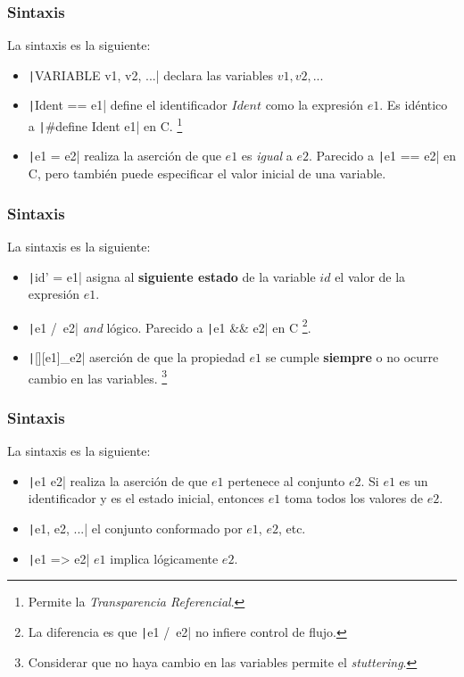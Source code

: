 \documentclass{beamer}
\begin{document}
\begin{frame}[fragile]
  \frametitle{Sintaxis}

  La sintaxis es la siguiente:

  \begin{itemize}
    \item \texttt|VARIABLE v1, v2, ...| declara las variables $v1, v2, ...$
    \item \texttt|Ident == e1| define el identificador $Ident$ como la expresión $e1$.
          Es idéntico a \texttt|#define Ident e1| en C.
          \footnote{Permite la \emph{Transparencia Referencial}.}
    \item \texttt|e1 = e2| realiza la aserción de que $e1$ es \emph{igual} a $e2$.
          Parecido a \texttt|e1 == e2| en C,
          pero también puede especificar el valor inicial de una variable.
  \end{itemize}
\end{frame}

\begin{frame}[fragile]
  \frametitle{Sintaxis}

  La sintaxis es la siguiente:

  \begin{itemize}
    \item \texttt|id' = e1| asigna al \textbf{siguiente estado} de la variable $id$
          el valor de la expresión $e1$.
    \item \texttt|e1 /\ e2| \emph{and} lógico. Parecido a \texttt|e1 && e2| en C
          \footnote{La diferencia es que \texttt|e1 /\ e2| no infiere control de flujo.}.
    \item \texttt|[][e1]_e2| aserción de que la propiedad $e1$ se cumple \textbf{siempre}
          o no ocurre cambio en las variables.
          \footnote{Considerar que no haya cambio en las variables permite el \emph{stuttering}.}
  \end{itemize}
\end{frame}

\begin{frame}[fragile]
  \frametitle{Sintaxis}

  La sintaxis es la siguiente:

  \begin{itemize}
    \item \texttt|e1 \in e2| realiza la aserción de que $e1$
          pertenece al conjunto $e2$. Si $e1$ es un identificador y es el
          estado inicial, entonces $e1$ toma todos los valores de $e2$.
    \item \texttt|{e1, e2, ...}| el conjunto conformado por $e1$, $e2$, etc.
    \item \texttt|e1 => e2| $e1$ implica lógicamente $e2$.
  \end{itemize}
\end{frame}
\end{document}
